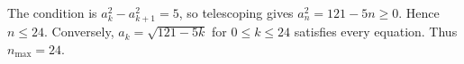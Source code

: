 The condition is $a_k^2-a_{k+1}^2=5$, so telescoping gives $a_n^2=121-5n\ge0$. Hence $n\le24$. Conversely, $a_k=\sqrt{121-5k}$ for $0\le k\le24$ satisfies every equation. Thus $\boxed{n_{\max}=24}$.
